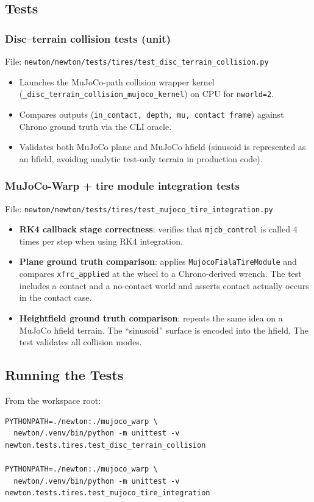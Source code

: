 \subsection{Tests}
\label{sec:substep4-tests}

\subsubsection{Disc--terrain collision tests (unit)}
File: \texttt{newton/newton/tests/tires/test\_disc\_terrain\_collision.py}
\begin{itemize}
  \item Launches the MuJoCo-path collision wrapper kernel (\texttt{\_disc\_terrain\_collision\_mujoco\_kernel})
        on CPU for \texttt{nworld=2}.
  \item Compares outputs (\texttt{in\_contact, depth, mu, contact frame}) against Chrono ground truth via the CLI oracle.
  \item Validates both MuJoCo plane and MuJoCo hfield (sinusoid is represented as an hfield, avoiding analytic test-only terrain in production code).
\end{itemize}

\subsubsection{MuJoCo-Warp + tire module integration tests}
File: \texttt{newton/newton/tests/tires/test\_mujoco\_tire\_integration.py}
\begin{itemize}
  \item \textbf{RK4 callback stage correctness}:
        verifies that \texttt{mjcb\_control} is called 4 times per step when using RK4 integration.
  \item \textbf{Plane ground truth comparison}:
        applies \texttt{MujocoFialaTireModule} and compares \texttt{xfrc\_applied} at the wheel to a Chrono-derived wrench.
        The test includes a contact and a no-contact world and asserts contact actually occurs in the contact case.
  \item \textbf{Heightfield ground truth comparison}:
        repeats the same idea on a MuJoCo hfield terrain. The ``sinusoid'' surface is encoded into the hfield.
        The test validates all collision modes.
\end{itemize}

\subsection{Running the Tests}
From the workspace root:
\begin{verbatim}
PYTHONPATH=./newton:./mujoco_warp \
  newton/.venv/bin/python -m unittest -v newton.tests.tires.test_disc_terrain_collision

PYTHONPATH=./newton:./mujoco_warp \
  newton/.venv/bin/python -m unittest -v newton.tests.tires.test_mujoco_tire_integration
\end{verbatim}

